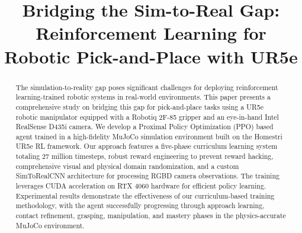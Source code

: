 \documentclass[conference]{IEEEtran}
\begin{document}
\title{Bridging the Sim-to-Real Gap: Reinforcement Learning for Robotic Pick-and-Place with UR5e}

\author{
\and
{}
\and
{}
}

\maketitle

\begin{abstract}
The simulation-to-reality gap poses significant challenges for deploying reinforcement learning-trained robotic systems in real-world environments. This paper presents a comprehensive study on bridging this gap for pick-and-place tasks using a UR5e robotic manipulator equipped with a Robotiq 2F-85 gripper and an eye-in-hand Intel RealSense D435i camera. We develop a Proximal Policy Optimization (PPO) based agent trained in a high-fidelity MuJoCo simulation environment built on the Homestri UR5e RL framework. Our approach features a five-phase curriculum learning system totaling 27 million timesteps, robust reward engineering to prevent reward hacking, comprehensive visual and physical domain randomization, and a custom SimToRealCNN architecture for processing RGBD camera observations. The training leverages CUDA acceleration on RTX 4060 hardware for efficient policy learning. Experimental results demonstrate the effectiveness of our curriculum-based training methodology, with the agent successfully progressing through approach learning, contact refinement, grasping, manipulation, and mastery phases in the physics-accurate MuJoCo environment.
\end{abstract}
\end{document}
